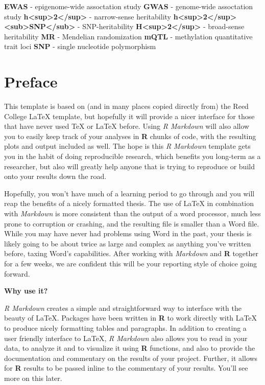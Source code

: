 \documentclass[11pt,oneside]{bristolthesis}
\begin{document}
  \hypersetup{linkcolor=black}
  \setcounter{tocdepth}{4}
  \tableofcontents
  \listoftables
  \listoffigures
  \begin{abbreviations}
    \textbf{EWAS} - epigenome-wide assoctation study
    \textbf{GWAS} - genome-wide assoctation study
    \textbf{h<sup>2</sup>} - narrow-sense heritability
    \textbf{h<sup>2</sup><sub>SNP</sub>} - SNP-heritability
    \textbf{H<sup>2</sup>} - broad-sense heritability
    \textbf{MR} - Mendelian randomization
    \textbf{mQTL} - methylation quantitative trait loci
    \textbf{SNP} - single nucleotide polymorphism
  \end{abbreviations}
\mainmatter %
\pagestyle{plain}
\hypertarget{preface}{%
\chapter*{Preface}\label{preface}}

This template is based on (and in many places copied directly from) the Reed College LaTeX template, but hopefully it will provide a nicer interface for those that have never used TeX or LaTeX before. Using \emph{R Markdown} will also allow you to easily keep track of your analyses in \textbf{R} chunks of code, with the resulting plots and output included as well. The hope is this \emph{R Markdown} template gets you in the habit of doing reproducible research, which benefits you long-term as a researcher, but also will greatly help anyone that is trying to reproduce or build onto your results down the road.

Hopefully, you won't have much of a learning period to go through and you will reap the benefits of a nicely formatted thesis. The use of LaTeX in combination with \emph{Markdown} is more consistent than the output of a word processor, much less prone to corruption or crashing, and the resulting file is smaller than a Word file. While you may have never had problems using Word in the past, your thesis is likely going to be about twice as large and complex as anything you've written before, taxing Word's capabilities. After working with \emph{Markdown} and \textbf{R} together for a few weeks, we are confident this will be your reporting style of choice going forward.

\textbf{Why use it?}

\emph{R Markdown} creates a simple and straightforward way to interface with the beauty of LaTeX. Packages have been written in \textbf{R} to work directly with LaTeX to produce nicely formatting tables and paragraphs. In addition to creating a user friendly interface to LaTeX, \emph{R Markdown} also allows you to read in your data, to analyze it and to visualize it using \textbf{R} functions, and also to provide the documentation and commentary on the results of your project. Further, it allows for \textbf{R} results to be passed inline to the commentary of your results. You'll see more on this later.
\end{document}
